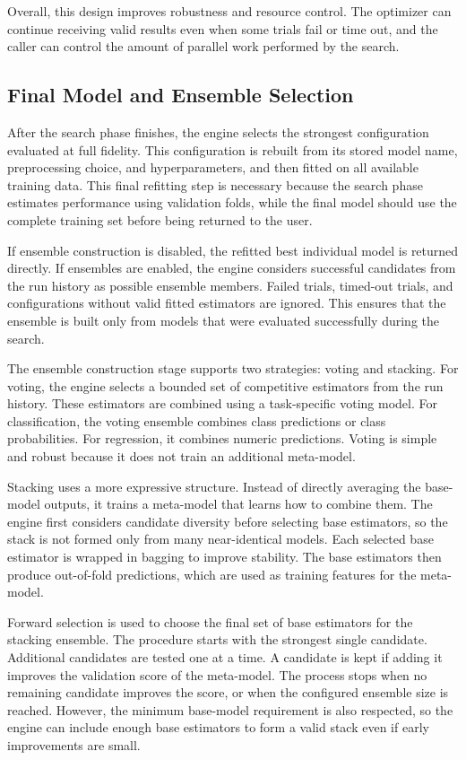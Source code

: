 \documentclass[12pt,a4paper,oneside]{report}
\begin{document}
\noindent Overall, this design improves robustness and resource control. The optimizer can
continue receiving valid results even when some trials fail or time out, and the
caller can control the amount of parallel work performed by the search.


\subsection{Final Model and Ensemble Selection}

After the search phase finishes, the engine selects the strongest configuration
evaluated at full fidelity. This configuration is rebuilt from its stored model
name, preprocessing choice, and hyperparameters, and then fitted on all
available training data. This final refitting step is necessary because the
search phase estimates performance using validation folds, while the final model
should use the complete training set before being returned to the user.

\noindent If ensemble construction is disabled, the refitted best individual model is
returned directly. If ensembles are enabled, the engine considers successful
candidates from the run history as possible ensemble members. Failed trials,
timed-out trials, and configurations without valid fitted estimators are ignored.
This ensures that the ensemble is built only from models that were evaluated
successfully during the search.

\noindent The ensemble construction stage supports two strategies: voting and stacking.
For voting, the engine selects a bounded set of competitive estimators from the
run history. These estimators are combined using a task-specific voting model.
For classification, the voting ensemble combines class predictions or class
probabilities. For regression, it combines numeric predictions. Voting is simple
and robust because it does not train an additional meta-model.

\noindent Stacking uses a more expressive structure. Instead of directly averaging the
base-model outputs, it trains a meta-model that learns how to combine them. The
engine first considers candidate diversity before selecting base estimators, so
the stack is not formed only from many near-identical models. Each selected base
estimator is wrapped in bagging to improve stability. The base estimators then
produce out-of-fold predictions, which are used as training features for the
meta-model.

\noindent Forward selection is used to choose the final set of base estimators for the
stacking ensemble. The procedure starts with the strongest single candidate.
Additional candidates are tested one at a time. A candidate is kept if adding it
improves the validation score of the meta-model. The process stops when no
remaining candidate improves the score, or when the configured ensemble size is
reached. However, the minimum base-model requirement is also respected, so the
engine can include enough base estimators to form a valid stack even if early
improvements are small.
\end{document}
